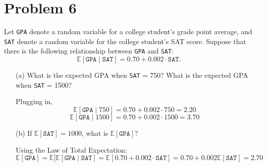 \documentclass[11pt]{article}
\newcommand{\bbE}{\mathbb{E}}
\begin{document}
\newpage
\section*{Problem 6}
\begin{problem}
    Let \texttt{GPA} denote a random variable for a college student’s grade point average, and \texttt{SAT} denote a
random variable for the college student’s SAT score. Suppose that there is the following relationship
between \texttt{GPA} and \texttt{SAT}:
\[
\mathbb{E}[\texttt{GPA} \mid \texttt{SAT}] = 0.70 + 0.002 \cdot \texttt{SAT}.
\]

\begin{enumerate}
    \item[(a)] What is the expected GPA when \texttt{SAT} = 750? What is the expected GPA when \texttt{SAT} = 1500?
\begin{solution}
    Plugging in, 
\[\bbE[\texttt{GPA} \mid 750] = 0.70 + 0.002 \cdot 750 = \boxed{2.20}\]
\[\bbE[\texttt{GPA} \mid 1500] = 0.70 + 0.002 \cdot 1500 = \boxed{3.70}\]
\end{solution}
    \item[(b)] If \( \mathbb{E}[\texttt{SAT}] = 1000 \), what is \( \mathbb{E}[\texttt{GPA}] \)?
\begin{solution}
    Using the Law of Total Expectation:
    \[\bbE[\texttt{GPA}] = \bbE[\bbE[\texttt{GPA}\mid \texttt{SAT}] = \bbE[0.70 + 0.002 \cdot \texttt{SAT}] = 0.70 + 0.002\bbE[\texttt{SAT}] = \boxed{2.70}\]
\end{solution}
\end{enumerate}

\end{problem}


\newpage
\end{document}
